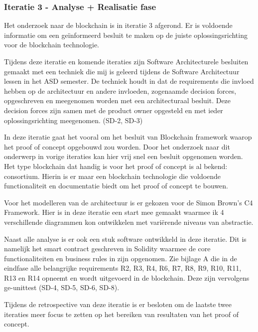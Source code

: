 \subsubsection{Iteratie 3 - Analyse + Realisatie fase}
Het onderzoek naar de blockchain is in iteratie 3 afgerond. Er is voldoende informatie om een geïnformeerd besluit te maken op de juiste oplossingsrichting voor de blockchain technologie. \par

Tijdens deze iteratie en komende iteraties zijn Software Architecturele besluiten gemaakt met een techniek die mij is geleerd tijdens de Software Architectuur lessen in het ASD semester. De techniek houdt in dat de requirements die invloed hebben op de architectuur en andere invloeden, zogenaamde decision forces, opgeschreven en meegenomen worden met een architecturaal besluit. Deze decision forces zijn samen met de product owner opgesteld en met ieder oplossingsrichting meegenomen. (SD-2, SD-3)\par

In deze iteratie gaat het vooral om het besluit van Blockchain framework waarop het proof of concept opgebouwd zou worden. Door het onderzoek naar dit onderwerp in vorige iteraties kan hier vrij snel een besluit opgenomen worden. Het type blockchain dat handig is voor het proof of concept is al bekend: consortium. Hierin is er maar een blockchain technologie die voldoende functionaliteit en documentatie biedt om het proof of concept te bouwen.\par

Voor het modelleren van de architectuur is er gekozen voor de Simon Brown’s C4 Framework. Hier is in deze iteratie een start mee gemaakt waarmee ik 4 verschillende diagrammen kon ontwikkelen met variërende niveaus van abstractie.\par

Naast alle analyse is er ook een stuk software ontwikkeld in deze iteratie. Dit is namelijk het smart contract geschreven in Solidity waarmee de core functionaliteiten en business rules in zijn opgenomen. Zie bijlage A die in de eindfase alle belangrijke requirements R2, R3, R4, R6, R7, R8, R9, R10, R11, R13 en R14 opneemt en wordt uitgevoerd in de blockchain. Deze zijn vervolgens ge-unittest (SD-4, SD-5, SD-6, SD-8).\par

Tijdens de retrospective van deze iteratie is er besloten om de laatste twee iteraties meer focus te zetten op het bereiken van resultaten van het proof of concept.
